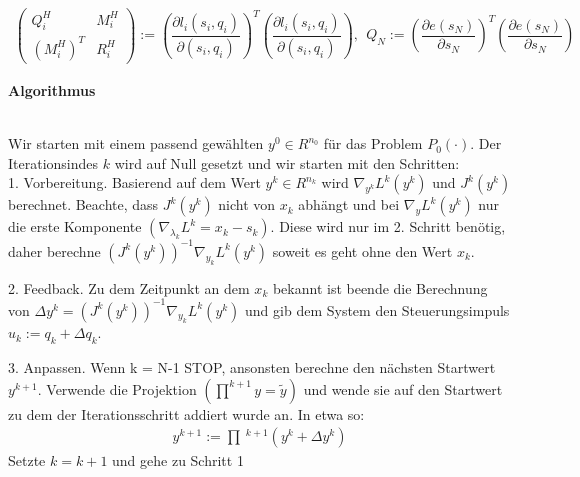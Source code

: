 \documentclass[12pt,a4paper]{article}
\begin{document}
  \begin{align*}
  \begin{pmatrix}
  Q_i^{H} & M_i^{H} \\
  (M_i^{H})^{T} & R_i^{H}
  \end{pmatrix} :=
  \left( 
  \dfrac{\partial l_i (s_i,q_i)}{\partial (s_i,q_i)}
  \right) ^{T}
  \left( 
  \dfrac{\partial l_i (s_i,q_i)}{\partial (s_i,q_i)}
  \right)
  , \ \ 
  Q_N :=
  \left( 
  \dfrac{\partial e (s_N)}{\partial s_N}
  \right) ^{T}
  \left( 
  \dfrac{\partial e (s_N)}{\partial s_N}
  \right)
  \end{align*}
  \begin{large}
  \textbf{Algorithmus}
  \end{large} \\
  Wir starten mit einem passend gewählten $ y^{0}\in R^{n_0} $ für das Problem $ P_0 (\cdot) $. Der Iterationsindes $k$ wird auf Null gesetzt und wir starten mit den Schritten: \\
  
  1. Vorbereitung. Basierend auf dem Wert $ y^{k} \in R^{n_k}$ wird $ \nabla_{y^{k}} L^{k}(y^{k})$ und $ J^{k}(y^{k})$ berechnet. Beachte, dass $ J^{k}(y^{k})$ nicht von $ x_k $ abhängt und bei $ \nabla_y L^{k}(y^{k})$ nur die erste Komponente $( \nabla_{\lambda_k} L^{k}= x_k - s_k ) $. Diese wird nur im 2. Schritt benötig, daher berechne $ (J^{k}(y^{k}))^{-1} \nabla_{y_k} L^{k}(y^{k}) $ soweit es geht ohne den Wert $ x_k $.
  
  2. Feedback. Zu dem Zeitpunkt an dem $ x_k $ bekannt ist beende die Berechnung von $ \Delta y^{k} = (J^{k}(y^{k}))^{-1} \nabla_{y_k} L^{k}(y^{k}) $ und gib dem System den Steuerungsimpuls $ u_k := q_k + \Delta q_k $.
  
  3. Anpassen. Wenn k = N-1 STOP, ansonsten berechne den nächsten Startwert $ y^{k+1} $. Verwende die Projektion $ (\prod ^{k+1} y = \tilde{y} )$ und wende sie auf den Startwert zu dem der Iterationsschritt addiert wurde an. In etwa so:
  \begin{align*}
  y^{k+1} := \prod \ ^{k+1} ( y^{k} + \Delta y^{k} )
  \end{align*}
  Setzte $ k = k + 1 $ und gehe zu Schritt 1  
  
\end{document}
